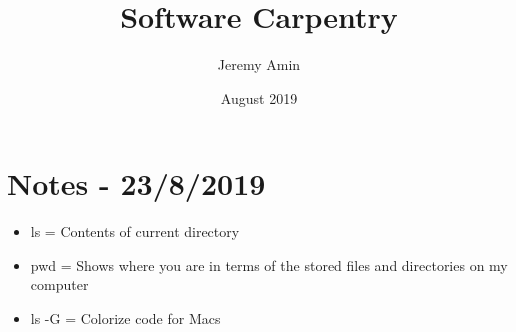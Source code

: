 \documentclass{article}
\title{Software Carpentry}
\author{Jeremy Amin}
\date{August 2019}
\begin{document}
\maketitle

\section{Notes - 23/8/2019}

\begin{itemize}
    \item ls = Contents of current directory
    \item pwd = Shows where you are in terms of the stored files and directories on my computer
    \item ls -G = Colorize code for Macs
\end{itemize}
\end{document}

